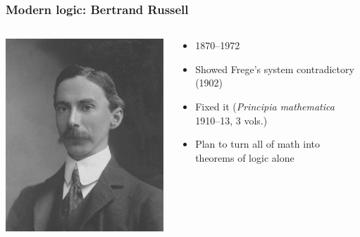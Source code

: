 \begin{frame}
  \frametitle{Modern logic: Bertrand Russell}

  \begin{columns}
    \begin{column}{.5\textwidth}
      \includegraphics[height=.8\textheight]{../assets/russell}
    \end{column}
    \begin{column}{.5\textwidth}
      \begin{itemize}[<+->]
        \item 1870--1972
        \item Showed Frege's system contradictory (1902)
        \item Fixed it (\textit{Principia mathematica} 1910--13, 3 vols.)
        \item Plan to turn all of math into theorems of logic alone
      \end{itemize}
    \end{column}
  \end{columns}
\end{frame}

